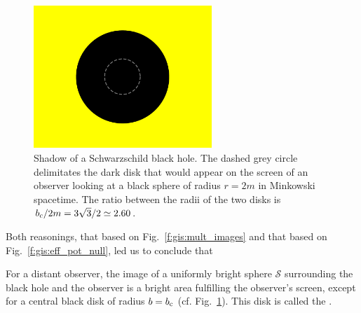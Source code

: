 \begin{figure}
\centerline{\includegraphics[width=0.6\textwidth]{gis_shadow.pdf}}
\caption[]{\label{f:gis:shadow} \footnotesize
Shadow of a Schwarzschild black hole. The dashed grey circle delimitates the
dark disk that would appear on the screen of an observer looking at
a black sphere of radius $r=2m$ in Minkowski spacetime. The ratio between
the radii of the two disks is $b_{\rm c} / 2m = 3\sqrt{3}/2 \simeq 2.60$.}
\end{figure}


Both reasonings, that based on Fig.~\ref{f:gis:mult_images} and that
based on Fig.~\ref{f:gis:eff_pot_null}, led us to conclude that
\begin{prop}
For a distant observer, the image of a uniformly bright sphere $\mathscr{S}$ surrounding
the black hole and the observer is a bright area fulfilling
the observer's screen, except for a central black disk of radius $b=b_{\rm c}$
(cf. Fig.~\ref{f:gis:shadow}).
This disk is called the
.
\end{prop}

